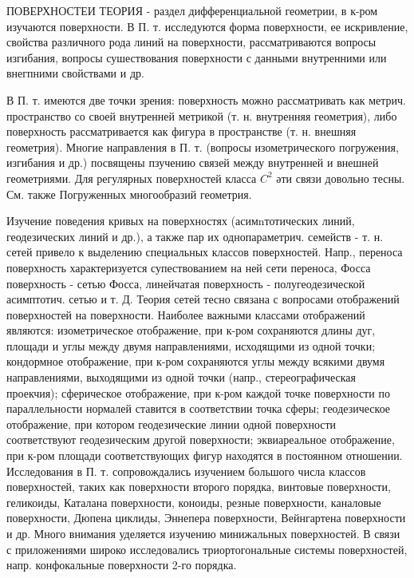 \documentclass[10pt]{article}
\begin{document}
ПОВЕРХНОСТЕИ ТЕОРИЯ - раздел дифференциальной геометрии, в к-ром изучаются поверхности. В П. т. исследуются форма поверхности, ее искривление, свойства различного рода линий на поверхности, рассматриваются вопросы изгибания, вопросы сушествования поверхности с данными внутренними или внегпними свойствами и др.



В П. т. имеются две точки зрения: поверхность можно рассматривать как метрич. пространство со своей внутренней метрикой (т. н. внутренняя геометрия), либо поверхность рассматривается как фигура в пространстве (т. н. внешняя геометрия). Многие направления в П. т. (вопросы изометрического погружения, изгибания и др.) посвящены пзучению связей между внутренней и внешней геометриями. Для регулярных поверхностей класса $C^{2}$ әти связи довольно тесны. См. также Погруженных многообразий геометрия.



Изучение поведения кривых на поверхностях (асимnтотических линий, геодезических линий и др.), а также пар их однопараметрич. семейств - т. н. сетей привело к выделению специальных классов поверхностей. Напр., переноса поверхность характеризуется супествованием на ней сети переноса, Фосса поверхность - сетью Фосса, линейчатая поверхность - полугеодезической асимптотич. сетью и т. Д. Теория сетей тесно связана с вопросами отображений поверхностей на поверхности. Наиболее важными классами отображений являются: изометрическое отображение, при к-ром сохраняются длины дуг, площади и углы между двумя направлениями, исходящими из одной точки; кондормное отображение, при к-ром сохраняются углы между всякими двумя направлениями, выходящими из одной точки (напр., стереографическая проекчия); сферическое отображение, при к-ром каждой точке поверхности по параллельности нормалей ставится в соответствии точка сферы; геодезическое отображение, при котором геодезические линии одной поверхности соответствуют геодезическим другой поверхности; эквиареальное отображение, при к-ром площади соответствующих фигур находятся в постоянном отношении. Исследования в П. т. сопровождались изучением большого числа классов поверхностей, таких как поверхности второго порядка, винтовые поверхности, геликоиды, Каталана поверхности, коноиды, резные поверхности, каналовые поверхности, Дюпена циклиды, Эннепера поверхности, Вейнгартена поверхности и др. Много внимания уделяется изучению минижальных поверхностей. В связи с приложениями широко исследовались триортогональные системы поверхностей, напр. конфокальные поверхности 2-го порядка.
\end{document}

